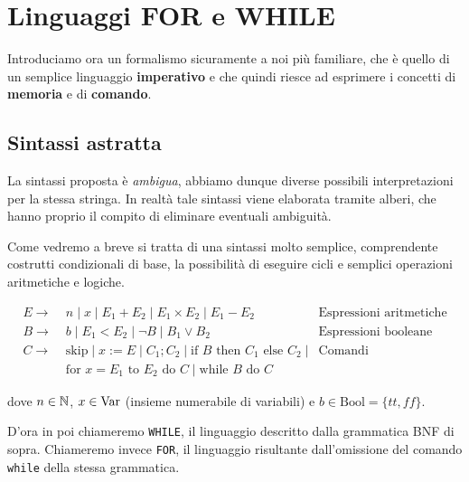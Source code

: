 \chapter{Linguaggi FOR e WHILE}
Introduciamo ora un formalismo sicuramente a noi più familiare,
che è quello di un semplice linguaggio \textbf{imperativo} e
che quindi riesce ad esprimere i concetti di \textbf{memoria}
e di \textbf{comando}.

\section{Sintassi astratta}
La sintassi proposta è \emph{ambigua}, abbiamo dunque diverse
possibili interpretazioni per la stessa stringa. In realtà
tale sintassi viene elaborata tramite alberi, che hanno proprio
il compito di eliminare eventuali ambiguità.

Come vedremo a breve si tratta di una sintassi molto semplice,
comprendente costrutti condizionali di base, la possibilità
di eseguire cicli e semplici operazioni aritmetiche e logiche.

\begin{align*}
	E \to                                                 &
	\; n \; | \; x \; | \; E_1 + E_2 \; | \;
	E_1 \times E_2 \; | \; E_1 - E_2
	                                                      &
	\text{Espressioni aritmetiche}                          \\
	B \to                                                 &
	\; b \; | \; E_1 < E_2 \; | \; \lnot B \; | \;
	B_1 \lor B_2
	                                                      &
	\text{Espressioni booleane}                             \\
	C\to                                                  &
	\; \text{skip} \; | \; x := E \; | \; C_1 ; C_2 \; | \;
	\text{if } B \text{ then } C_1 \text{ else } C_2 \; | &
	\text{Comandi}                                          \\ &
	\; \text{for } x = E_1 \text{ to } E_2 \text{ do } C \; |
	\; \text{while } B \text{ do } C
\end{align*}

dove $n \in \mathbb{N}$, $x \in \operatorname{Var}$ (insieme numerabile di
variabili) e $b \in \text{Bool} = \{ tt, ff \}$.

D'ora in poi chiameremo \verb|WHILE|, il linguaggio descritto
dalla grammatica BNF di sopra. Chiameremo invece \verb|FOR|,
il linguaggio risultante dall'omissione del comando \verb|while|
della stessa grammatica.

